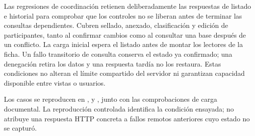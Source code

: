 Las regresiones de coordinación retienen deliberadamente las respuestas de listado e historial para comprobar que los controles no se liberan antes de terminar las consultas dependientes. Cubren sellado, anexado, clasificación y edición de participantes, tanto al confirmar cambios como al consultar una base después de un conflicto. La carga inicial espera el listado antes de montar los lectores de la ficha. Un fallo transitorio de consulta conserva el estado ya confirmado; una denegación retira los datos y una respuesta tardía no los restaura. Estas condiciones no alteran el límite compartido del servidor ni garantizan capacidad disponible entre vistas o usuarios.

{\raggedright Los casos se reproducen en ,  y , junto con las comprobaciones de carga documental. La reproducción controlada identifica la condición ensayada; no atribuye una respuesta HTTP concreta a fallos remotos anteriores cuyo estado no se capturó.\par}



